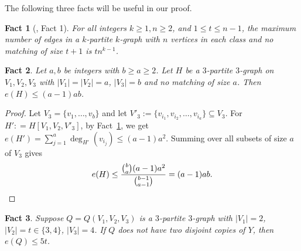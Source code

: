 \documentclass[11pt, reqno]{amsart}    	%
\newtheorem{fact}{Fact}
\theoremstyle{definition}
\numberwithin{equation}{section}
\begin{document}
	The following three facts will be useful in our proof.
	\begin{fact}
		[\cite{Markstr2011Perfect}, Fact 1]
		\label{f2}
		For all integers $k\ge1, n\ge2$, and $1\le t \le n-1$, the maximum number of edges in a $k$-partite $k$-graph with $n$ vertices in each class and no matching of size $t+1$ is $tn^{k-1}$.
	\end{fact}	
	\begin{fact} \label{f3}
		Let $a,b$ be integers with $b\ge a\ge2$. Let $H$ be a $3$-partite $3$-graph on $V_1,V_2,V_3$ with $|V_1|=|V_2|=a$, $|V_3|=b$ and no matching of size $a$. Then $e(H)\le(a-1)ab$.
	\end{fact}	
	\begin{proof}
		Let $ V_3=\{v_1,\dots,v_b\}$ and let $V'_{3} := \{v_{i_1},v_{i_2},\dots,v_{i_a}\} \subseteq  V_3$. 
		For $H' : = H[V_1,V_2,V'_3]$, by Fact~\ref{f2}, we get $e(H')=\sum_{j=1}^{a}\deg_{H'}(v_{i_j})\le (a-1)a^{2}$.
		Summing over all subsets of size $a$ of $V_3$ gives
		\[
		e(H)\le \frac{\binom{b}{a}(a-1)a^{2}}{\binom{b-1}{a-1}}=(a-1)ab. \qedhere
		\]
	\end{proof}
		\begin{fact} \label{f5}
		Suppose $ Q=Q(V_1,V_2,V_3) $ is a $3$-partite $3$-graph with $ |V_1|=2$, $|V_2|=t\in \{3, 4\}$, $|V_3|=4 $. If $ Q $ does not have two disjoint copies of $Y$, then	$e(Q)\le 5t$.
	\end{fact}
\end{document}
